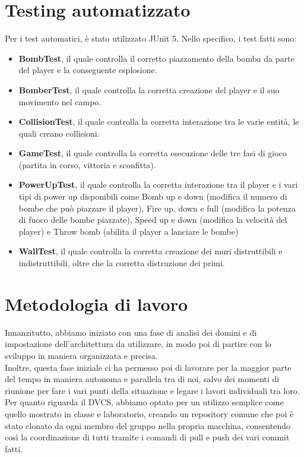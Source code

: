 \documentclass[a4paper,12pt]{report}
\begin{document}
\section{Testing automatizzato}
Per i test automatici, è stato utilizzato JUnit 5.
Nello specifico, i test fatti sono:
\begin{itemize}
    \item \textbf{BombTest}, il quale controlla il corretto piazzamento della bomba da parte del player e la conseguente esplosione.
    \item \textbf{BomberTest}, il quale controlla la corretta creazione del player e il suo movimento nel campo.
    \item \textbf{CollisionTest}, il quale controlla la corretta interazione tra le varie entità, le quali creano collisioni.
    \item \textbf{GameTest}, il quale controlla la corretta esecuzione delle tre fasi di gioco (partita in corso, vittoria e sconfitta).
    \item \textbf{PowerUpTest}, il quale controlla la corretta interazione tra il player e i vari tipi di power up disponibili come Bomb up e down (modifica il numero di bombe che può piazzare il player), Fire up, down e full (modifica la potenza di fuoco delle bombe piazzate), Speed up e down (modifica la velocità del player) e Throw bomb (abilita il player a lanciare le bombe)
    \item \textbf{WallTest}, il quale controlla la corretta creazione dei muri distruttibili e indistruttibili, oltre che la corretta distruzione dei primi.
\end{itemize}


\section{Metodologia di lavoro}

Innanzitutto, abbiamo iniziato con una fase di analisi dei domini e di impostazione dell'architettura da utilizzare, in modo poi di partire con lo sviluppo in maniera organizzata e precisa.
\\
Inoltre, questa fase iniziale ci ha permesso poi di lavorare per la maggior parte del tempo in maniera autonoma e parallela tra di noi, salvo dei momenti di riunione per fare i vari punti della situazione e legare i lavori individuali tra loro.
\\
Per quanto riguarda il DVCS, abbiamo optato per un utilizzo semplice come quello mostrato in classe e laboratorio, creando un repository comune che poi è stato clonato da ogni membro del gruppo nella propria macchina, consentendo così la coordinazione di tutti tramite i comandi di pull e push dei vari commit fatti.
\end{document}
